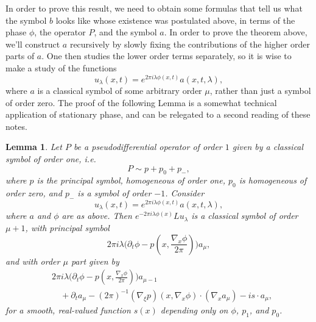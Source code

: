 \documentclass{article}
\theoremstyle{plain}
\newtheorem{lemma}[theorem]{Lemma}
\theoremstyle{remark}
\theoremstyle{definition}
\begin{document}
In order to prove this result, we need to obtain some formulas that tell us what the symbol $b$ looks like whose existence was postulated above, in terms of the phase $\phi$, the operator $P$, and the symbol $a$. In order to prove the theorem above, we'll construct $a$ recursively by slowly fixing the contributions of the higher order parts of $a$. One then studies the lower order terms separately, so it is wise to make a study of the functions
%
\[ u_\lambda(x,t) = e^{2 \pi i \lambda \phi(x,t)} a(x,t,\lambda),\]
%
where $a$ is a classical symbol of some arbitrary order $\mu$, rather than just a symbol of order zero.
 The proof of the following Lemma is a somewhat technical application of stationary phase, and can be relegated to a second reading of these notes.

\begin{lemma}
	Let $P$ be a pseudodifferential operator of order $1$ given by a classical symbol of order one, i.e.
	\[ P \sim p + p_0 + p_-, \]
	where $p$ is the principal symbol, homogeneous of order one, $p_0$ is homogeneous of order zero, and $p_-$ is a symbol of order $-1$. Consider
	\[ u_\lambda(x,t) = e^{2 \pi i \lambda \phi(x,t)} a(x,t,\lambda), \]
	where $a$ and $\phi$ are as above. Then $e^{-2 \pi i \lambda \phi(x)} L u_\lambda$ is a classical symbol of order $\mu+1$, with principal symbol
	\[ 2\pi i \lambda \Bigg( \partial_t \phi - p \left( x, \frac{\nabla_x \phi}{2 \pi} \right) \Bigg) a_\mu, \]
	and with order $\mu$ part given by
	\begin{align*}
		&2 \pi i \lambda \Bigg( \partial_t \phi - p \left( x, \frac{\nabla_x \phi}{2 \pi} \right) \Bigg) a_{\mu - 1}\\
		&\quad + \partial_t a_\mu - (2\pi)^{-1} (\nabla_\xi p)(x, \nabla_x \phi) \cdot (\nabla_x a_\mu) - i s \cdot a_\mu,
	\end{align*}
	for a smooth, real-valued function $s(x)$ depending only on $\phi$, $p_1$, and $p_0$.
\end{lemma}
\end{document}
